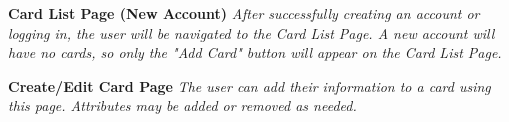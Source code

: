 \documentclass[12pt]{article}%
\begin{document}
\begin{center}
    \clearpage
    {\bf \Large Card List Page (New Account)}
    {\it After successfully creating an account or logging in, the user will be navigated to the Card List Page. A new account will have no cards, so only the "Add Card" button will appear on the Card List Page.}

    \clearpage
    {\bf \Large Create/Edit Card Page}
    {\it The user can add their information to a card using this page. Attributes may be added or removed as needed.}


\end{center}
\end{document}
